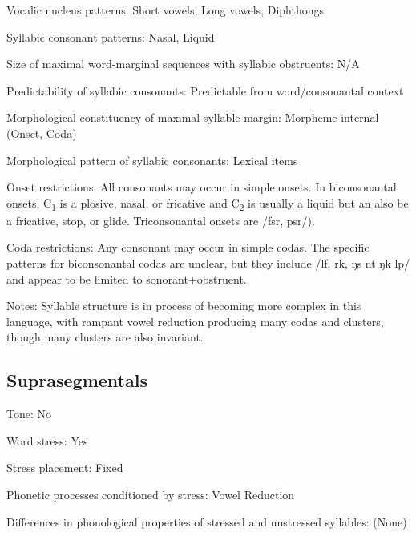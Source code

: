 {\begin{appendixdesc}
\item[Vocalic nucleus patterns:] Short vowels, Long vowels, Diphthongs

\item[Syllabic consonant patterns:] Nasal, Liquid

\item[Size of maximal word-marginal sequences with syllabic obstruents:] N/A

\item[Predictability of syllabic consonants:] Predictable from word/consonantal context

\item[Morphological constituency of maximal syllable margin:] Morpheme-internal (Onset, Coda)

\item[Morphological pattern of syllabic consonants:] Lexical items

\item[Onset restrictions:] All consonants may occur in simple onsets. In biconsonantal onsets, C\textsubscript{1} is a plosive, nasal, or fricative and C\textsubscript{2} is usually a liquid but an also be a fricative, stop, or glide. Triconsonantal onsets are /fsr, psr/).

\item[Coda restrictions:] Any consonant may occur in simple codas. The specific patterns for biconsonantal codas are unclear, but they include /lf, rk, ŋs nt ŋk lp/ and appear to be limited to sonorant+obstruent.

\item[Notes:] Syllable structure is in process of becoming more complex in this language, with rampant vowel reduction producing many codas and clusters, though many clusters are also invariant.
\end{appendixdesc}
\subsection*{Suprasegmentals}
\begin{appendixdesc}
\item[Tone:] No

\item[Word stress:] Yes

\item[Stress placement:] Fixed

\item[Phonetic processes conditioned by stress:] Vowel Reduction

\item[Differences in phonological properties of stressed and unstressed syllables:] (None)


\end{appendixdesc}}
